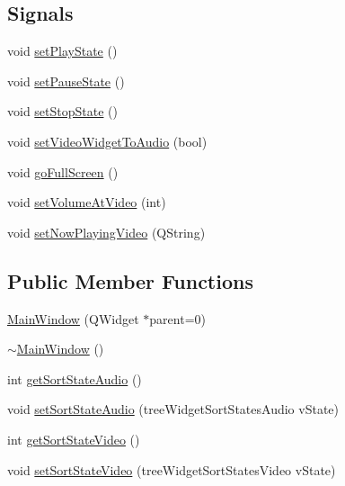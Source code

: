\subsection*{Signals}
\begin{DoxyCompactItemize}
\item 
void \hyperlink{class_main_window_a9306b3de57fd2e4f6135e2ccb54bb7e8}{set\-Play\-State} ()
\item 
void \hyperlink{class_main_window_adca025abe664d30b94956428bf7018ed}{set\-Pause\-State} ()
\item 
void \hyperlink{class_main_window_ab9186092f55d31ceea72b3033179b3b5}{set\-Stop\-State} ()
\item 
void \hyperlink{class_main_window_a159654f7756ae9e44dfb0d9b9108f5a4}{set\-Video\-Widget\-To\-Audio} (bool)
\item 
void \hyperlink{class_main_window_a52c015261a65b80b1c4bf91a4636eabe}{go\-Full\-Screen} ()
\item 
void \hyperlink{class_main_window_aefcd44e040267b357d7940d01d4b6f82}{set\-Volume\-At\-Video} (int)
\item 
void \hyperlink{class_main_window_a95d2e2f769be6afbe13ca026d22b1936}{set\-Now\-Playing\-Video} (Q\-String)
\end{DoxyCompactItemize}
\subsection*{Public Member Functions}
\begin{DoxyCompactItemize}
\item 
\hyperlink{class_main_window_a8b244be8b7b7db1b08de2a2acb9409db}{Main\-Window} (Q\-Widget $\ast$parent=0)
\item 
\hyperlink{class_main_window_ae98d00a93bc118200eeef9f9bba1dba7}{$\sim$\-Main\-Window} ()
\item 
int \hyperlink{class_main_window_aa5c41c7fa4a061a6f12868c7a45540f2}{get\-Sort\-State\-Audio} ()
\item 
void \hyperlink{class_main_window_af28d26cf9634987d5ed5811c9046227e}{set\-Sort\-State\-Audio} (tree\-Widget\-Sort\-States\-Audio v\-State)
\item 
int \hyperlink{class_main_window_aaba702cedaf6cc6c924cda87607f9504}{get\-Sort\-State\-Video} ()
\item 
void \hyperlink{class_main_window_a85cb80e484e5fb77e1373d005de34c8b}{set\-Sort\-State\-Video} (tree\-Widget\-Sort\-States\-Video v\-State)
\end{DoxyCompactItemize}


